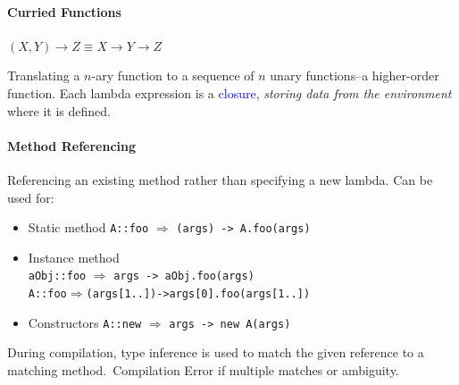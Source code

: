 \paragraph{Curried Functions}
\begin{center}
  $(X,Y)\rightarrow Z\equiv X\rightarrow Y\rightarrow Z$
\end{center}
Translating a $n$-ary function to a sequence of $n$ unary functions–a
higher-order function. Each lambda expression is a \textcolor{Blue}{closure},
\emph{storing data from the environment} where it is defined.
\paragraph{Method Referencing}
Referencing an existing method rather than specifying a new lambda. Can be used for:
\begin{itemize}
  \item Static method \verb$A::foo$ $\Rightarrow$ \verb$(args) -> A.foo(args)$
  \item Instance method\\
    \verb$aObj::foo$ $\Rightarrow$ \verb$args -> aObj.foo(args)$\\
    \verb$A::foo$$\Rightarrow$\verb$(args[1..])->args[0].foo(args[1..])$
  \item Constructors \verb$A::new$ $\Rightarrow$ \verb$args -> new A(args)$
\end{itemize}
During compilation, type inference is used to match the given reference to a
matching method.\ \textcolor{Bittersweet}{Compilation Error} if multiple matches
or ambiguity.

